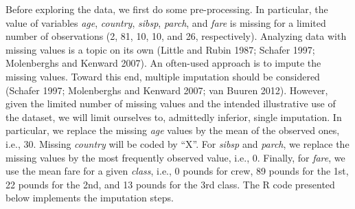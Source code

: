 \documentclass[12pt,]{krantz}
\begin{document}
Before exploring the data, we first do some pre-processing. In particular, the value of variables \emph{age}, \emph{country}, \emph{sibsp}, \emph{parch}, and \emph{fare} is missing for a limited number of observations (2, 81, 10, 10, and 26, respectively). Analyzing data with missing values is a topic on its own (Little and Rubin 1987; Schafer 1997; Molenberghs and Kenward 2007). An often-used approach is to impute the missing values. Toward this end, multiple imputation should be considered (Schafer 1997; Molenberghs and Kenward 2007; van Buuren 2012). However, given the limited number of missing values and the intended illustrative use of the dataset, we will limit ourselves to, admittedly inferior, single imputation. In particular, we replace the missing \emph{age} values by the mean of the observed ones, i.e., 30. Missing \emph{country} will be coded by ``X''. For \emph{sibsp} and \emph{parch}, we replace the missing values by the most frequently observed value, i.e., 0. Finally, for \emph{fare}, we use the mean fare for a given \emph{class}, i.e., 0 pounds for crew, 89 pounds for the 1st, 22 pounds for the 2nd, and 13 pounds for the 3rd class. The R code presented below implements the imputation steps.
\end{document}
